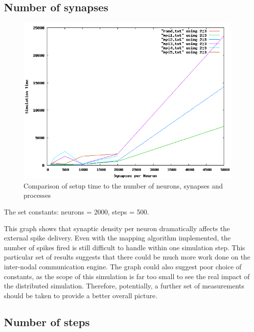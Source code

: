 \subsection{Number of synapses}

\begin{figure}[h!]
\begin{center}
\includegraphics[scale = 0.4]{images/evaluation/distributed_synapses.png}
\end{center}
\caption{Comparison of setup time to the number of neurons, synapses and processes}
\end{figure}

The set constants: neurons = 2000, steps = 500.

This graph shows that synaptic density per neuron dramatically affects the external spike delivery. Even with the mapping algorithm implemented, the number of spikes fired is still difficult to handle within one simulation step. This particular set of results suggests that there could be much more work done on the inter-nodal communication engine. The graph could also suggest poor choice of constants, as the scope of this simulation is far too small to see the real impact of the distributed simulation. Therefore, potentially, a further set of measurements should be taken to provide a better overall picture.

\subsection{Number of steps}

